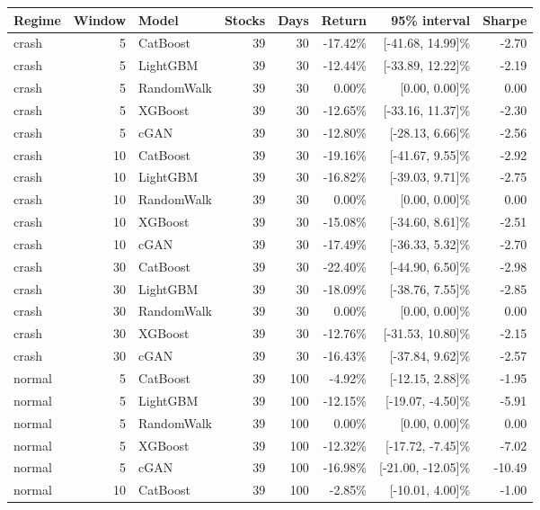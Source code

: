 \documentclass[11pt,a4paper]{article}
\begin{document}
\begin{center}\small
\begin{tabular}{lrlrrrrr}
\toprule
Regime & Window & Model & Stocks & Days & Return & 95\% interval & Sharpe \\
\midrule
crash & 5 & CatBoost & 39 & 30 & -17.42\% & [-41.68, 14.99]\% & -2.70 \\
crash & 5 & LightGBM & 39 & 30 & -12.44\% & [-33.89, 12.22]\% & -2.19 \\
crash & 5 & RandomWalk & 39 & 30 & 0.00\% & [0.00, 0.00]\% & 0.00 \\
crash & 5 & XGBoost & 39 & 30 & -12.65\% & [-33.16, 11.37]\% & -2.30 \\
crash & 5 & cGAN & 39 & 30 & -12.80\% & [-28.13, 6.66]\% & -2.56 \\
\addlinespace
crash & 10 & CatBoost & 39 & 30 & -19.16\% & [-41.67, 9.55]\% & -2.92 \\
crash & 10 & LightGBM & 39 & 30 & -16.82\% & [-39.03, 9.71]\% & -2.75 \\
crash & 10 & RandomWalk & 39 & 30 & 0.00\% & [0.00, 0.00]\% & 0.00 \\
crash & 10 & XGBoost & 39 & 30 & -15.08\% & [-34.60, 8.61]\% & -2.51 \\
crash & 10 & cGAN & 39 & 30 & -17.49\% & [-36.33, 5.32]\% & -2.70 \\
\addlinespace
crash & 30 & CatBoost & 39 & 30 & -22.40\% & [-44.90, 6.50]\% & -2.98 \\
crash & 30 & LightGBM & 39 & 30 & -18.09\% & [-38.76, 7.55]\% & -2.85 \\
crash & 30 & RandomWalk & 39 & 30 & 0.00\% & [0.00, 0.00]\% & 0.00 \\
crash & 30 & XGBoost & 39 & 30 & -12.76\% & [-31.53, 10.80]\% & -2.15 \\
crash & 30 & cGAN & 39 & 30 & -16.43\% & [-37.84, 9.62]\% & -2.57 \\
\addlinespace
normal & 5 & CatBoost & 39 & 100 & -4.92\% & [-12.15, 2.88]\% & -1.95 \\
normal & 5 & LightGBM & 39 & 100 & -12.15\% & [-19.07, -4.50]\% & -5.91 \\
normal & 5 & RandomWalk & 39 & 100 & 0.00\% & [0.00, 0.00]\% & 0.00 \\
normal & 5 & XGBoost & 39 & 100 & -12.32\% & [-17.72, -7.45]\% & -7.02 \\
normal & 5 & cGAN & 39 & 100 & -16.98\% & [-21.00, -12.05]\% & -10.49 \\
\addlinespace
normal & 10 & CatBoost & 39 & 100 & -2.85\% & [-10.01, 4.00]\% & -1.00 \\

\end{tabular}
\end{center}
\end{document}
